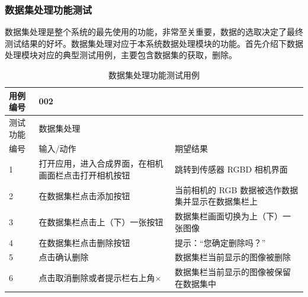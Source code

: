 \subsubsection{数据集处理功能测试}
数据集处理是整个系统的最先使用的功能，非常至关重要，数据的选取决定了最终测试结果的好坏。数据集处理对应于本系统数据处理模块的功能。首先介绍下数据处理模块对应的典型测试用例，主要包含数据集的获取，删除。

\begin{table}[t]
	\centering
	\small{}\setlength{}
	\caption{数据集处理功能测试用例}
	\begin{tabular}{|p{2cm}<{\centering}|p{4cm}<{\centering}|p{4cm}<{\centering}|}
		\hline
		用例编号 & \multicolumn{2}{|l|}{002}       \\
		\hline
		测试功能 & \multicolumn{2}{|l|}{数据集处理}       \\
		\hline
		编号 & 输入/动作 & 期望结果 \\
		\hline
		1 & 打开应用，进入合成界面，在相机画面栏点击打开相机按钮 & 跳转到传感器 RGBD 相机界面 \\
		\hline
		2 & 在数据集栏点击添加按钮 & 当前相机的 RGB 数据被选作数据集并显示在数据集栏上 \\
		\hline
		3 & 在数据集栏点击上（下）一张按钮 & 数据集栏画面切换为上（下）一张图像 \\
		\hline
		4 & 在数据集栏点击删除按钮 & 提示：“您确定删除吗？” \\
		\hline
		5 & 点击确认删除 & 数据集栏当前显示的图像被删除 \\
		\hline
		6 & 点击取消删除或者提示栏右上角$\times$ & 数据集栏当前显示的图像被保留在数据集中 \\
		\hline
	\end{tabular}
	\label{tab:getdataset}
\end{table}

